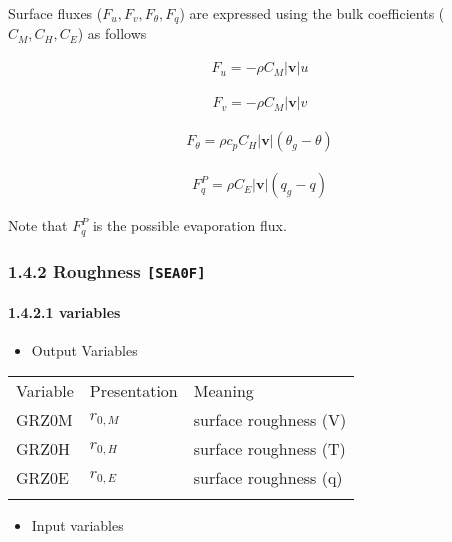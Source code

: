 Surface fluxes (\(F_u, F_v, F_\theta, F_q\)) are expressed using the
bulk coefficients (\(C_M, C_H, C_E\)) as follows

\begin{eqnarray}
    F_u  =  - \rho C_M |{\mathbf{v}}| u
\end{eqnarray}

\begin{eqnarray}
    F_v  =  - \rho C_M |{\mathbf{v}}| v
\end{eqnarray}

\begin{eqnarray}
    F_\theta  = \rho c_p C_H |{\mathbf{v}}| ( \theta_g - \theta )
\end{eqnarray}

\begin{eqnarray}
    F_q^P =  \rho C_E |{\mathbf{v}}| ( q_g - q )
\end{eqnarray}

Note that \(F_q^P\) is the possible evaporation flux.

\hypertarget{roughness-sea0f}{%
\subsubsection{\texorpdfstring{1.4.2 Roughness
\texttt{{[}SEA0F{]}}}{1.4.2 Roughness {[}SEA0F{]}}}\label{roughness-sea0f}}

\hypertarget{variables}{%
\paragraph{1.4.2.1 variables}\label{variables}}

\begin{itemize}
\tightlist
\item
  Output Variables
\end{itemize}

\setlength\LTleft{0pt}\setlength\LTright{0pt}\begin{longtable}[]{@{}lll@{}}
\toprule\relax
Variable & Presentation & Meaning \\ \addlinespace
\midrule\relax
\endhead
GRZ0M & \(r_{0,M}\) & surface roughness (V) \\ \addlinespace
GRZ0H & \(r_{0,H}\) & surface roughness (T) \\ \addlinespace
GRZ0E & \(r_{0,E}\) & surface roughness (q) \\ \addlinespace
\bottomrule
\end{longtable}

\begin{itemize}
\tightlist
\item
  Input variables
\end{itemize}

